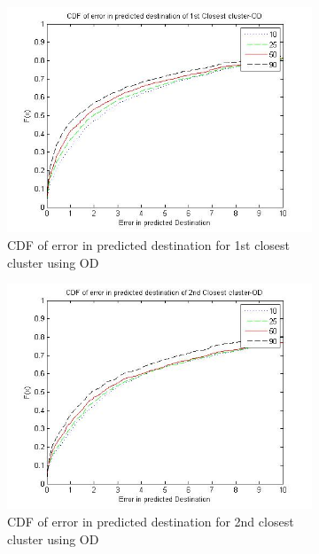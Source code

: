 \begin{figure}
    \centering
    \begin{subfigure}[t]{.5\textwidth}
        \centering
        \includegraphics[scale=0.4]{figs/od_top.jpg}
        \caption{CDF of error in predicted destination for 1st closest cluster using OD}
    \end{subfigure}%
	\begin{subfigure}[t]{.5\textwidth}
        \centering
        \includegraphics[scale=0.4]{figs/od_top2.jpg}
        \caption{CDF of error in predicted destination for 2nd closest cluster using OD}
    \end{subfigure}
    \begin{subfigure}[t]{.5\textwidth}
        \centering

\end{subfigure}
\end{figure}
